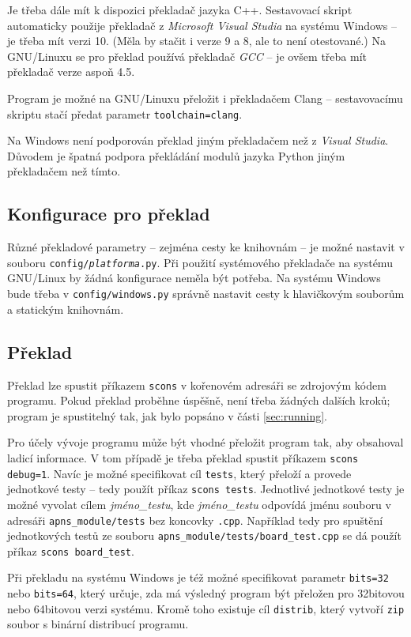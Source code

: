 \documentclass{article}
\begin{document}
Je třeba dále mít k dispozici překladač jazyka C++. Sestavovací skript
automaticky použije překladač z \emph{Microsoft Visual Studia} na systému 
Windows -- je třeba mít verzi 10. (Měla by stačit i verze 9 a 8, ale to není 
otestované.) Na GNU/Linuxu se pro překlad používá překladač \emph{GCC} -- je 
ovšem třeba mít překladač verze aspoň 4.5.

Program je možné na GNU/Linuxu přeložit i překladačem Clang -- sestavovacímu
skriptu stačí předat parametr \texttt{toolchain=clang}.

Na Windows není podporován překlad jiným překladačem než z \emph{Visual Studia}.
Důvodem je špatná podpora překládání modulů jazyka Python jiným překladačem než
tímto.

\subsection{Konfigurace pro překlad}
Různé překladové parametry -- zejména cesty ke knihovnám -- je možné nastavit
v souboru \texttt{config/\textit{platforma}.py}. Při použití systémového 
překladače na systému GNU/Linux by žádná konfigurace neměla být potřeba. Na 
systému Windows bude třeba v \texttt{config/windows.py} správně nastavit cesty k
hlavičkovým souborům a statickým knihovnám.

\subsection{Překlad}
Překlad lze spustit příkazem \texttt{scons} v kořenovém adresáři se zdrojovým
kódem programu. Pokud překlad proběhne úspěšně, není třeba žádných dalších 
kroků; program je spustitelný tak, jak bylo popsáno v části \ref{sec:running}.

Pro účely vývoje programu může být vhodné přeložit program tak, aby obsahoval
ladicí informace. V tom případě je třeba překlad spustit příkazem 
\texttt{scons debug=1}. Navíc je možné specifikovat cíl \texttt{tests}, který 
přeloží a provede jednotkové testy -- tedy použít příkaz \texttt{scons tests}. 
Jednotlivé jednotkové testy je možné vyvolat cílem \emph{jméno\_testu}, kde 
\emph{jméno\_testu} odpovídá jménu souboru v adresáři 
\texttt{apns\_module/tests} bez koncovky \texttt{.cpp}. Například tedy pro 
spuštění jednotkových testů ze souboru 
\texttt{apns\_module/tests/board\_test.cpp} se dá použít příkaz 
\texttt{scons board\_test}.

Při překladu na systému Windows je též možné specifikovat parametr
\texttt{bits=32} nebo \texttt{bits=64}, který určuje, zda má výsledný program 
být přeložen pro 32bitovou nebo 64bitovou verzi systému. Kromě toho existuje cíl
\texttt{distrib}, který vytvoří \texttt{zip} soubor s binární distribucí
programu.
\end{document}
